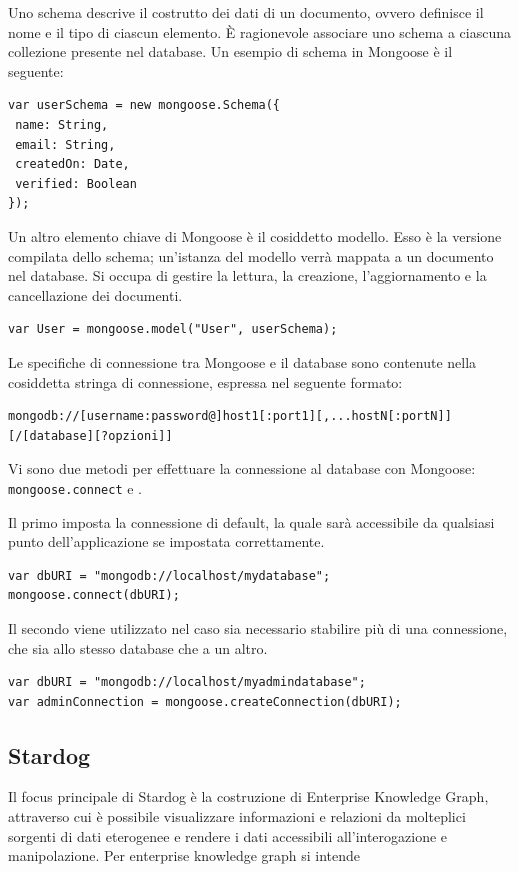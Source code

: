 Uno schema descrive il costrutto dei dati di un documento, ovvero definisce il nome e il tipo di ciascun elemento. È ragionevole associare uno schema a ciascuna collezione presente nel database. Un esempio di schema in Mongoose è il seguente:

\begin{lstlisting}
var userSchema = new mongoose.Schema({
 name: String,
 email: String,
 createdOn: Date,
 verified: Boolean
});
\end{lstlisting}

Un altro elemento chiave di Mongoose è il cosiddetto modello. Esso è la versione compilata dello schema; un'istanza del modello verrà mappata a un documento nel database. Si occupa di gestire la lettura, la creazione, l'aggiornamento e la cancellazione dei documenti.\cite{holmes}
\begin{lstlisting}
var User = mongoose.model("User", userSchema);
\end{lstlisting}

Le specifiche di connessione tra Mongoose e il database sono contenute nella cosiddetta stringa di connessione, espressa nel seguente formato:\cite{connection-string}
\begin{lstlisting}
mongodb://[username:password@]host1[:port1][,...hostN[:portN]][/[database][?opzioni]]
\end{lstlisting}

Vi sono due metodi per effettuare la connessione al database con Mongoose: \texttt{mongoose.connect} e .\cite{holmes-connection}

Il primo imposta la connessione di default, la quale sarà accessibile da qualsiasi punto dell'applicazione se impostata correttamente.
\begin{lstlisting}
var dbURI = "mongodb://localhost/mydatabase";
mongoose.connect(dbURI);
\end{lstlisting}
Il secondo viene utilizzato nel caso sia necessario stabilire più di una connessione, che sia allo stesso database che a un altro.
\begin{lstlisting}
var dbURI = "mongodb://localhost/myadmindatabase";
var adminConnection = mongoose.createConnection(dbURI);
\end{lstlisting}

\subsection{Stardog}
Il focus principale di Stardog è la costruzione di Enterprise Knowledge Graph, attraverso cui è possibile visualizzare informazioni e relazioni da molteplici sorgenti di dati eterogenee e rendere i dati accessibili all'interogazione e manipolazione. 
Per enterprise knowledge graph si intende 

